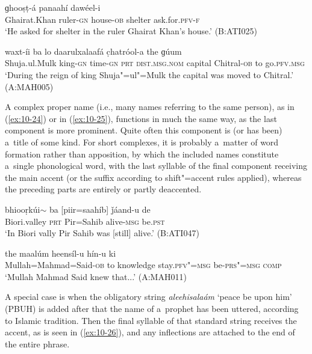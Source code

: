 \begin{exe}
\ex
\label{ex:10-22}
\gll [ɣeyrat"=xaán hakim-í] ɡhooṣṭ-á panaahí dawéel-i \\
Ghairat.Khan ruler-\textsc{gn} house-\textsc{ob} shelter ask.for.\textsc{pfv-f} \\
\glt `He asked for shelter in the ruler Ghairat Khan's house.' (B:ATI025)

\ex
\label{ex:10-23}
 waxt-íi ba lo daarulxalaafá c̣hatróol-a the ɡúum \\
Shuja.ul.Mulk king-\textsc{gn} time-\textsc{gn} \textsc{prt} \textsc{dist.msg.nom}  capital Chitral-\textsc{ob} to go.\textsc{pfv.msg}  \\
\glt `During the reign of king Shuja"=ul"=Mulk the capital was moved to Chitral.' (A:MAH005)
\end{exe}

A complex proper name (i.e., many names referring to the same person), as in (\ref{ex:10-24}) or in (\ref{ex:10-25}), functions in much the same way, as the last component is more prominent. Quite often this component is (or has been) a~title of some kind. For short complexes, it is probably a~matter of word formation rather than apposition, by which the included names constitute a~single phonological word, with the last syllable of the final component receiving the main accent (or the suffix according to shift"=accent rules applied), whereas the preceding parts are entirely or partly deaccented.

\begin{exe}
\ex
\label{ex:10-24}
\gll bhiooṛkúi$\sim$ ba [piir=saahíb] ǰáand-u de \\
Biori.valley \textsc{prt} Pir=Sahib alive-\textsc{msg} be.\textsc{pst} \\
\glt `In Biori vally Pir Sahib was [still] alive.' (B:ATI047)

\ex
\label{ex:10-25}
\gll [mulaa=mhaamad=seed-á] the maalúm heensíl-u hín-u ki \\
Mullah=Mahmad=Said-\textsc{ob} to knowledge stay.\textsc{pfv"=msg} be-\textsc{prs"=msg} \textsc{comp} \\
\glt `Mullah Mahmad Said knew that...' (A:MAH011)
\end{exe}

A special case is when the obligatory string \textit{aleehisalaám} `peace be upon him' (PBUH) is added after that the name of a~prophet has been uttered, according to Islamic tradition. Then the final syllable of that standard string receives the accent, as is seen in (\ref{ex:10-26}), and any inflections are attached to the end of the entire phrase.

